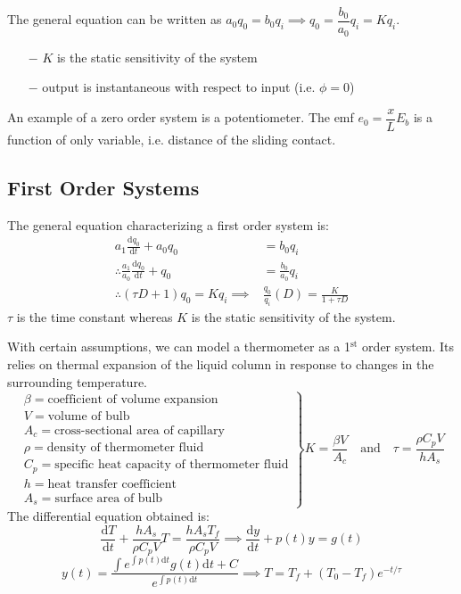 \documentclass[11pt]{article}
\theoremstyle{definition}
\let\b\beta
\begin{document}
The general equation can be written as $a_0q_0=b_0q_i\implies q_0=\dfrac{b_0}{a_0}q_i=Kq_i$.
\vspace{-2mm}

\begin{itemize}
	\itemsep-0em
	\item[$-$] $K$ is the static sensitivity of the system
	\item[$-$] output is instantaneous with respect to input (i.e. $\phi=0$)
\end{itemize}
\vspace{-4mm}

An example of a zero order system is a potentiometer. The emf $e_0=\dfrac{x}{L}E_b$ is a function of only variable, i.e. distance of the sliding contact.
\newpage
\subsection{First Order Systems}
The general equation characterizing a first order system is:
\begin{align*}
	a_1\frac{\text{d}q_0}{\text{d}t}+a_0q_0&=b_0q_i\\
	\therefore \frac{a_1}{a_0}\frac{\text{d}q_0}{\text{d}t}+q_0&=\frac{b_0}{a_0}q_i\\
	\therefore (\tau D+1)q_0=Kq_i\implies & \frac{q_0}{q_i}(D)=\frac{K}{1+\tau D}
\end{align*}
$\tau$ is the time constant whereas $K$ is the static sensitivity of the system.

With certain assumptions, we can model a thermometer as a 1$^{\text{st}}$ order system. Its relies on thermal expansion of the liquid column in response to changes in the surrounding temperature.
$$\left.\begin{array}{r}
\b=\text{coefficient of volume expansion}\\
V=\text{volume of bulb}\\
A_c=\text{cross-sectional area of capillary}\\
\rho=\text{density of thermometer fluid}\\
C_p=\text{specific heat capacity of thermometer fluid}\\
h=\text{heat transfer coefficient}\\
A_s=\text{surface area of bulb}
\end{array}\right\rbrace K=\frac{\b V}{A_c}\text{ }\text{ and }\text{ }\tau=\frac{\rho C_pV}{hA_s}
$$
The differential equation obtained is:
$$\frac{\text{d}T}{\text{d}t}+\frac{hA_s}{\rho C_pV}T=\frac{hA_sT_f}{\rho C_pV}\implies \frac{\text{d}y}{\text{d}t}+p(t)y=g(t)$$
$$y(t)=\frac{\int e^{\int p(t)\text{d}t}g(t)\text{d}t+C}{e^{\int p(t)\text{d}t}}\implies T=T_f+(T_0-T_f)e^{-t/\tau}$$
\end{document}
